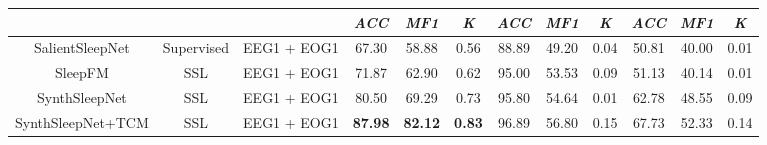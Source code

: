\begin{table*}[!htbp]
{{\begin{tabular}{c|c|c|ccc|ccc|ccc}
\cline{4-12}
                                                                                       &                                                                                            &                                            & \textit{ACC}   & \textit{MF1}   & \textit{K}                                                                & \textit{ACC}   & \textit{MF1}   & \textit{K}                                                    & \textit{ACC}   & \textit{MF1}   & \textit{K}                                                       \\ 
\hline
SalientSleepNet \cite{ref9}                                                                       & Supervised                                                                                 & EEG1
  + EOG1                              & 67.30          & 58.88          & 0.56                                                                      & 88.89          & 49.20          & 0.04                                                          & 50.81          & 40.00          & 0.01                                                             \\
SleepFM  \cite{ref23}                                                                              & SSL                                                                                        & EEG1
  + EOG1                              & 71.87          & 62.90          & 0.62                                                                      & 95.00          & 53.53          & 0.09                                                          & 51.13          & 40.14          & 0.01                                                             \\
SynthSleepNet                                                                          & SSL                                                                                        & EEG1
  + EOG1                              & 80.50          & 69.29          & 0.73                                                                      & 95.80          & 54.64          & 0.01                                                          & 62.78          & 48.55          & 0.09                                                             \\
SynthSleepNet+TCM                                                                      & SSL                                                                                        & EEG1
  + EOG1                              & \textbf{87.98} & \textbf{82.12} & \textbf{0.83}                                                             & 96.89          & 56.80          & 0.15                                                          & 67.73          & 52.33          & 0.14                                                             \\ 

\end{tabular}}}
\end{table*}
